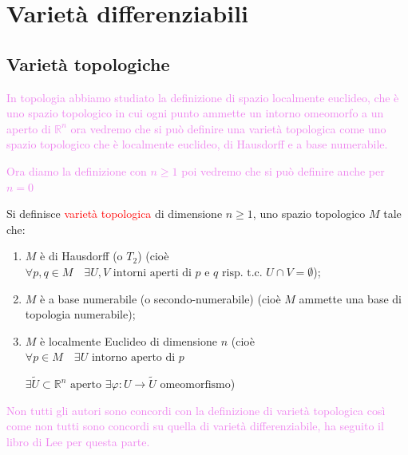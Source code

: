 \chapter{Varietà differenziabili}
    \section{Varietà topologiche}
        \textcolor{violet}{In topologia abbiamo studiato la definizione di spazio localmente euclideo, che è uno spazio topologico in cui ogni punto ammette un intorno omeomorfo a un aperto di $\mathbb{R}^n$ 
        ora vedremo che si può definire una varietà topologica come uno spazio topologico che è localmente euclideo, di Hausdorff e a base numerabile.}

        \textcolor{violet}{Ora diamo la definizione con $n \geq 1$ poi vedremo che si può definire anche per $n=0$}
        \begin{definizione}
        \mbox{}

        Si definisce \textcolor{red}{varietà topologica} di dimensione $n \ge 1$, uno spazio topologico $M$ tale che:
        \begin{enumerate}[label=\arabic*)]
            \item $M$ è di Hausdorff (o $T_2$) 
            \textcolor{blu}{(cioè $\forall p, q \in M \quad \exists U, V \text{ intorni aperti di } p \text{ e } q \text{ risp. t.c. } U \cap V = \emptyset$)};
            \item $M$ è a base numerabile (o secondo-numerabile) \textcolor{blu}{(cioè $M$ ammette una base di topologia numerabile)};
            \item $M$ è localmente Euclideo di dimensione $n$ 
            \textcolor{blu}{(cioè $\forall p \in M \quad \exists U \text{ intorno aperto di } p$} 
            
            \textcolor{blu}{$\exists \tilde{U} \subset \mathbb{R}^n \text{ aperto } \exists \varphi : U \to \tilde{U} \text{ omeomorfismo}$)}
        \end{enumerate}
        \end{definizione}
        \textcolor{violet}{Non tutti gli autori sono concordi con la definizione di varietà topologica così come non tutti sono concordi su quella di varietà differenziabile, ha seguito
        il libro di Lee per questa parte.}


